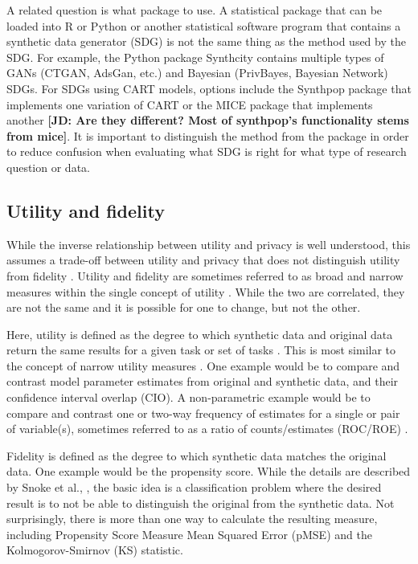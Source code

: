 \documentclass[runningheads]{llncs}
\newcommand{\jd}[1]{\scriptsize {\bf \color{red}[JD: #1]}\normalsize}
\begin{document}
A related question is what package to use.  A statistical package that can be loaded into R or Python or another statistical software program that contains a synthetic data generator (SDG) is not the same thing as the method used by the SDG.  For example, the Python package Synthcity \cite{synthcity} contains multiple types of GANs (CTGAN, AdsGan, etc.) and Bayesian (PrivBayes, Bayesian Network) SDGs.  For SDGs using CART models, options include the Synthpop package \cite{nowok2016synthpop} that implements one variation of CART \cite{reiter2005using} or the MICE package \cite{van2011mice} that implements another \cite{doove2014recursive}\jd{Are they different? Most of synthpop's functionality stems from mice}.  It is important to distinguish the method from the package in order to reduce confusion when evaluating what SDG is right for what type of research question or data.

\subsection{Utility and fidelity}

While the inverse relationship between utility and privacy is well understood, this assumes a trade-off between utility and privacy that does not distinguish utility from fidelity \cite{jordon2022synthetic}.  Utility and fidelity are sometimes referred to as broad and narrow measures within the single concept of utility \cite{snoke2018general,drechsler2009disclosure}.  While the two are correlated, they are not the same and it is possible for one to change, but not the other.  

Here, utility is defined as the degree to which synthetic data and original data return the same results for a given task or set of tasks \cite{jordon2022synthetic}.  This is most similar to the concept of narrow utility measures \cite{drechsler2009disclosure}.  One example would be to compare and contrast model parameter estimates from original and synthetic data, and their confidence interval overlap (CIO).  A non-parametric example would be to compare and contrast one or two-way frequency of estimates for a single or pair of variable(s), sometimes referred to as a ratio of counts/estimates (ROC/ROE) \cite{little2022comparing}.  

Fidelity is defined as the degree to which synthetic data matches the original data.  One example would be the propensity score.  While the details are described by Snoke et al., \cite{snoke2018general}, the basic idea is a classification problem where the desired result is to not be able to distinguish the original from the synthetic data.  Not surprisingly, there is more than one way to calculate the resulting measure, including Propensity Score Measure Mean Squared Error (pMSE) \cite{woo2009global} and the Kolmogorov-Smirnov (KS) statistic.
\end{document}
